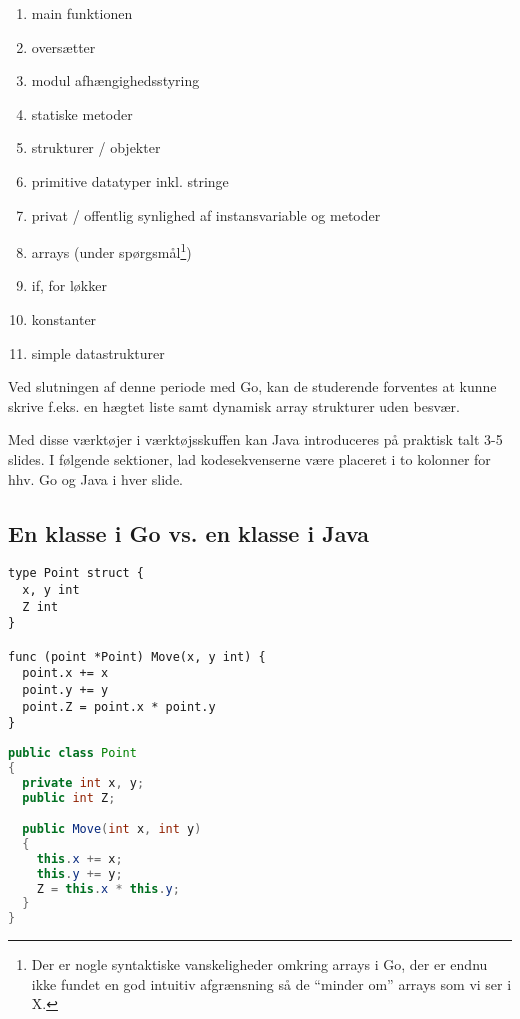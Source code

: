 \begin{enumerate}

\item main funktionen

\item oversætter

\item modul afhængighedsstyring

\item statiske metoder

\item strukturer / objekter

\item primitive datatyper inkl. stringe

\item privat / offentlig synlighed af instansvariable og metoder

\item arrays (under spørgsmål\footnote{Der er nogle syntaktiske vanskeligheder
omkring arrays i Go, der er endnu ikke fundet en god intuitiv afgrænsning så de
``minder om'' arrays som vi ser i X.})

\item if, for løkker

\item konstanter

\item simple datastrukturer

\end{enumerate}

Ved slutningen af denne periode med Go, kan de studerende forventes at kunne
skrive f.eks. en hægtet liste samt dynamisk array strukturer uden besvær.

Med disse værktøjer i værktøjsskuffen kan Java introduceres på praktisk talt
3-5 slides. I følgende sektioner, lad kodesekvenserne være placeret i to
kolonner for hhv. Go og Java i hver slide.

\subsection{En klasse i Go vs. en klasse i Java}

\begin{lstlisting}
type Point struct {
  x, y int
  Z int
}

func (point *Point) Move(x, y int) {
  point.x += x
  point.y += y
  point.Z = point.x * point.y
}
\end{lstlisting}

\begin{lstlisting}[language=Java]
public class Point
{
  private int x, y;
  public int Z;

  public Move(int x, int y)
  {
    this.x += x;
    this.y += y;
    Z = this.x * this.y;
  } 
}
\end{lstlisting}


